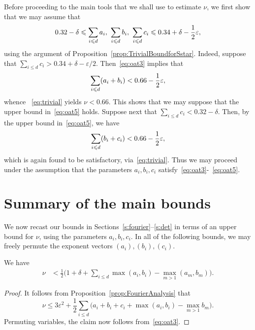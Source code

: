 Before proceeding to the main tools that we shall use to estimate $\nu$, we first show that we may assume that \begin{equation}\label{eq:oat5}
0.32 - \delta \leqslant \sum_{i\leqslant d} a_i ,~ \sum_{i\leqslant d} b_i ,~ \sum_{i\leqslant d} c_i \leqslant 0.34 + \delta-
\frac{1}{2}\varepsilon,
\end{equation}
using the argument of Proposition~\ref{prop:TrivialBoundforSstar}. Indeed, suppose that
$\sum_{i\leq d} c_i> 0.34 + \delta-\varepsilon/2$. Then~\eqref{eq:oat3} implies that
 \[
 \sum_{i\leqslant d} (a_i + b_i)<
 0.66-\frac{1}{2}\varepsilon,
 \]
 whence
~\eqref{eq:trivial} yields $\nu< 0.66$. This shows that we may suppose that the upper bound in~\eqref{eq:oat5} holds.
 Suppose next that
 $\sum_{i\leq d} c_i< 0.32 - \delta$. Then, by the upper bound in~\eqref{eq:oat5}, we have
 \[
 \sum_{i\leqslant d} (b_i + c_i)< 0.66-\frac{1}{2}\varepsilon,
 \]
which is again found to be satisfactory, via~\eqref{eq:trivial}. Thus we may proceed under the assumption that the parameters $a_i,b_i,c_i$ satisfy~\eqref{eq:oat3}-~\eqref{eq:oat5}.


\section{Summary of the main bounds}

We now recast our bounds in Sections~\ref{s:fourier}--\ref{s:det} in terms of
an upper bound for $\nu$, using
the parameters $a_i,b_i,c_i$.
In all of the following bounds, we may freely permute the exponent vectors $(a_i),(b_i),(c_i)$.

\begin{proposition}\label{prop:FourierBound}
We have
\begin{align*}
\nu & < \frac{1}{2}\Big(1+\delta +\sum_{i\leq d} \max(a_i,b_i) - \max_{m>1}(a_m,b_m)\Big).
\end{align*}
\end{proposition}
\begin{proof}
It follows from Proposition~\ref{prop:FourierAnalysis} that
\[
\nu \leq 3\varepsilon^2+
\frac{1}{2}\sum_{i\leq d}\Big(a_i+b_i+c_i +\max(a_i,b_i) - \max_{m>1}b_m\Big).
\]
Permuting variables, the claim now follows from~\eqref{eq:oat3}.
\end{proof}


